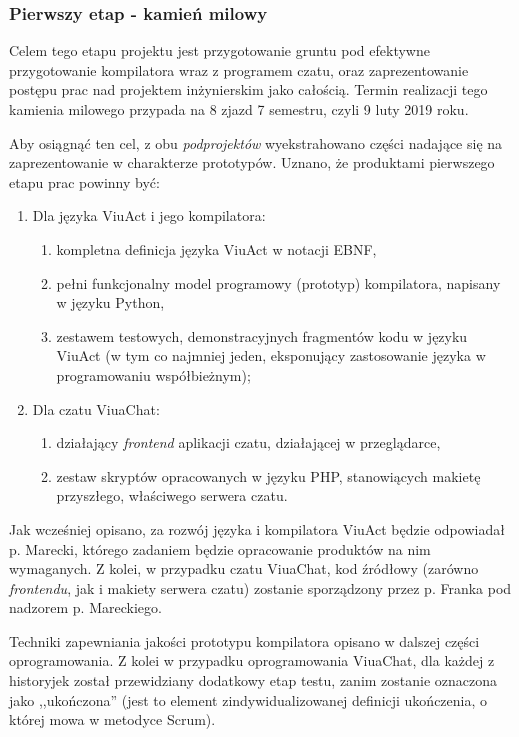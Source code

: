 \documentclass[11pt,oneside,a4paper,titlepage,onecolumn]{article}
\begin{document}
\subsubsection{Pierwszy etap - kamień milowy}
Celem tego etapu projektu jest przygotowanie gruntu pod efektywne przygotowanie kompilatora wraz z programem
czatu, oraz zaprezentowanie postępu prac nad projektem inżynierskim jako całością. Termin realizacji
tego kamienia milowego przypada na 8 zjazd 7 semestru, czyli 9 luty 2019 roku.

Aby osiągnąć ten cel, z obu \textit{podprojektów} wyekstrahowano części nadające się na zaprezentowanie
w charakterze prototypów. Uznano, że produktami pierwszego etapu prac powinny być:
\begin{enumerate}
	\item Dla języka ViuAct i jego kompilatora:
		\begin{enumerate}
			\item kompletna definicja języka ViuAct w notacji EBNF,
			\item pełni funkcjonalny model programowy (prototyp) kompilatora, napisany w języku Python,
			\item zestawem testowych, demonstracyjnych fragmentów kodu w języku ViuAct (w tym co najmniej 
			jeden, eksponujący zastosowanie języka w programowaniu współbieżnym);
		\end{enumerate}
	\item Dla czatu ViuaChat:
		\begin{enumerate}
			\item działający \textit{frontend} aplikacji czatu, działającej w przeglądarce,
			\item zestaw skryptów opracowanych w języku PHP, stanowiących makietę przyszłego, właściwego serwera czatu.
		\end{enumerate}
\end{enumerate}

Jak wcześniej opisano, za rozwój języka i kompilatora ViuAct będzie odpowiadał p. Marecki, którego zadaniem 
będzie opracowanie produktów na nim wymaganych. Z kolei, w przypadku czatu ViuaChat, kod źródłowy (zarówno 
\textit{frontendu}, jak i makiety serwera czatu) zostanie sporządzony przez p. Franka pod nadzorem p. Mareckiego.

Techniki zapewniania jakości prototypu kompilatora opisano w dalszej części oprogramowania. Z kolei w przypadku
oprogramowania ViuaChat, dla każdej z historyjek został przewidziany dodatkowy etap testu, zanim zostanie
oznaczona jako ,,ukończona'' (jest to element zindywidualizowanej definicji ukończenia, o której mowa w metodyce 
Scrum).
\end{document}
